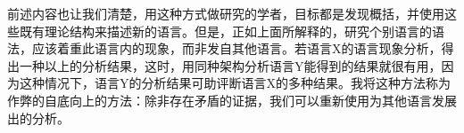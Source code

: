 前述内容也让我们清楚，用这种方式做研究的学者，目标都是发现概括，并使用这些既有理论结构来描述新的语言。但是，正如上面所解释的，研究个别语言的语法，应该着重此语言内的现象，而非发自其他语言。若语言X的语言现象分析，得出一种以上的分析结果，这时，用同种架构分析语言Y能得到的结果就很有用，因为这种情况下，语言Y的分析结果可助评断语言X的多种结果。我将这种方法称为作弊的自底向上的方法：除非存在矛盾的证据，我们可以重新使用为其他语言发展出的分析。

